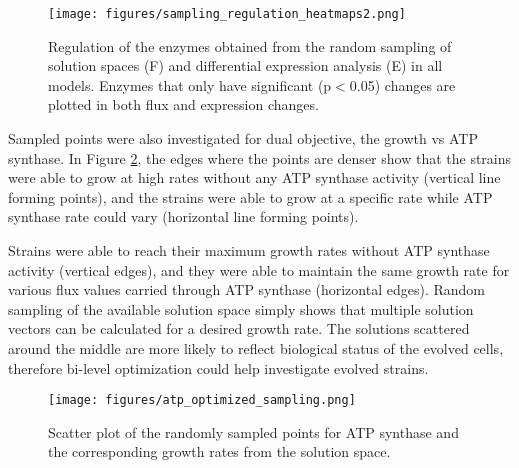 \begin{figure}[H]
  \begin{center}
  \texttt{[image: figures/sampling\_regulation\_heatmaps2.png]}
  \caption[Regulation of the enzymes obtained from the random sampling of solution spaces (F) and differential expression analysis (E) in all models. Enzymes that only have significant (p$<$0.05) changes are plotted in both flux and expression changes]{Regulation of the enzymes obtained from the random sampling of solution spaces (F) and differential expression analysis (E) in all models. Enzymes that only have significant (p$<$0.05) changes are plotted in both flux and expression changes. }
  \label{fig:sampling_regulation_heatmaps}
  \end{center}
\end{figure}

Sampled points were also investigated for dual objective, the growth vs ATP synthase. In Figure \ref{fig:bi_level}, the edges where the points are denser show that the strains were able to grow at high rates without any ATP synthase activity (vertical line forming points), and the strains were able to grow at a specific rate while ATP synthase rate could vary (horizontal line forming points).

Strains were able to reach their maximum growth rates without ATP synthase activity (vertical edges), and they were able to maintain the same growth rate for various flux values carried through ATP synthase (horizontal edges). Random sampling of the available solution space simply shows that multiple solution vectors can be calculated for a desired growth rate. The solutions scattered around the middle are more likely to reflect biological status of the evolved cells, therefore bi-level optimization could help investigate evolved strains.

 \begin{figure}
   \begin{center}
   \texttt{[image: figures/atp\_optimized\_sampling.png]}
   \caption[Scatter plot of the randomly sampled points for ATP synthase and the corresponding growth rates from the solution space.]{Scatter plot of the randomly sampled points for ATP synthase and the corresponding growth rates from the solution space.}
   \label{fig:bi_level}
   \end{center}
 \end{figure}

